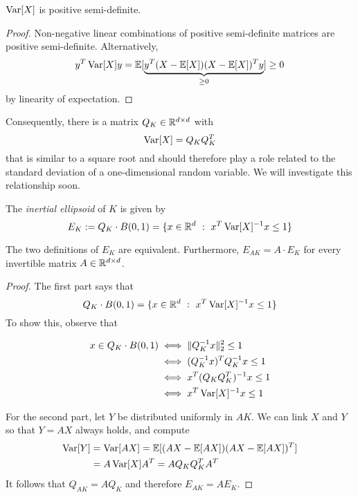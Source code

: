 \begin{proposition}
  $\operatorname{Var}[X]$ is positive semi-definite.
\end{proposition}
\begin{proof}
  Non-negative linear combinations of positive semi-definite matrices are positive semi-definite.
  Alternatively,
  \[
    y^T \operatorname{Var}[X] y = \mathbb{E}[ \underbrace{y^T (X - \mathbb{E}[X]) (X - \mathbb{E}[X])^T y}_{\geq 0} ] \geq 0
  \]
  by linearity of expectation.
\end{proof}

Consequently, there is a matrix $Q_K \in \mathbb{R}^{d \times d}$ with
\[
  \operatorname{Var}[X] = Q_K Q_K^T
\]
that is similar to a square root and should therefore play a role related to the standard deviation
of a one-dimensional random variable.
We will investigate this relationship soon.

\begin{definition}
  The \emph{inertial ellipsoid} of $K$ is given by
  \[
    E_K := Q_K \cdot B(0,1) = \{ x \in \mathbb{R}^d ~:~ x^T \operatorname{Var}[X]^{-1} x \leq 1 \}
  \]
\end{definition}

\begin{lemma}
  The two definitions of $E_K$ are equivalent.
  Furthermore, $E_{AK} = A \cdot E_K$ for every invertible matrix $A \in \mathbb{R}^{d \times d}$.
\end{lemma}
\begin{proof}
  The first part says that
  \[
    Q_K \cdot B(0,1) = \{ x \in \mathbb{R}^d ~:~ x^T \operatorname{Var}[X]^{-1} x \leq 1 \}
  \]
  To show this, observe that

  \begin{align*}
    x \in Q_K \cdot B(0,1) &\iff \|Q_K^{-1} x \|^2_2 \leq 1 \\
                           &\iff (Q_K^{-1} x)^T Q_K^{-1} x \leq 1 \\
                           &\iff x^T (Q_K Q_K^{T})^{-1} x \leq 1 \\
                           &\iff x^T \operatorname{Var}[X]^{-1} x \leq 1
  \end{align*}

  For the second part, let $Y$ be distributed uniformly in $AK$.
  We can link $X$ and $Y$ so that $Y = AX$ always holds, and compute
  \begin{align*}
    \operatorname{Var}[Y] &= \operatorname{Var}[AX] = \mathbb{E}[ (AX - \mathbb{E}[AX]) (AX - \mathbb{E}[AX])^T] \\
       & = A \operatorname{Var}[X] A^T = A Q_K Q_K^T A^T
  \end{align*}
  It follows that $Q_{AK} = A Q_K$ and therefore $E_{AK} = A E_K$.
\end{proof}


